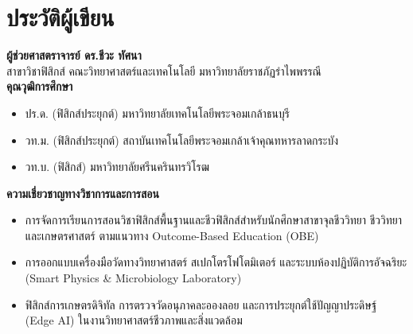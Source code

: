 \chapter*{ประวัติผู้เขียน}

\begin{center}
    \begin{tcolorbox}[
        enhanced,
        colback=softSmoke,
        colframe=physRoyalBlue,
        arc=4mm,
        boxrule=1.2pt,
        width=\textwidth
    ]
        \vspace{6pt}
        \textbf{\Large ผู้ช่วยศาสตราจารย์ ดร.ชีวะ ทัศนา}\\[6pt]
        {\large สาขาวิชาฟิสิกส์ คณะวิทยาศาสตร์และเทคโนโลยี มหาวิทยาลัยราชภัฏรำไพพรรณี}\\[8pt]

        \textbf{คุณวุฒิการศึกษา}
        \begin{itemize}
            \item ปร.ด. (ฟิสิกส์ประยุกต์) มหาวิทยาลัยเทคโนโลยีพระจอมเกล้าธนบุรี
            \item วท.ม. (ฟิสิกส์ประยุกต์) สถาบันเทคโนโลยีพระจอมเกล้าเจ้าคุณทหารลาดกระบัง
            \item วท.บ. (ฟิสิกส์) มหาวิทยาลัยศรีนครินทรวิโรฒ
        \end{itemize}

        \textbf{ความเชี่ยวชาญทางวิชาการและการสอน}
        \begin{itemize}
            \item การจัดการเรียนการสอนวิชาฟิสิกส์พื้นฐานและชีวฟิสิกส์สำหรับนักศึกษาสาขาจุลชีววิทยา ชีววิทยา และเกษตรศาสตร์ ตามแนวทาง Outcome-Based Education (OBE)
            \item การออกแบบเครื่องมือวัดทางวิทยาศาสตร์ สเปกโตรโฟโตมิเตอร์ และระบบห้องปฏิบัติการอัจฉริยะ (Smart Physics \& Microbiology Laboratory)
            \item ฟิสิกส์การเกษตรดิจิทัล การตรวจวัดอนุภาคละอองลอย และการประยุกต์ใช้ปัญญาประดิษฐ์ (Edge AI) ในงานวิทยาศาสตร์ชีวภาพและสิ่งแวดล้อม
        \end{itemize}
        \vspace{6pt}
    \end{tcolorbox}
\end{center}
